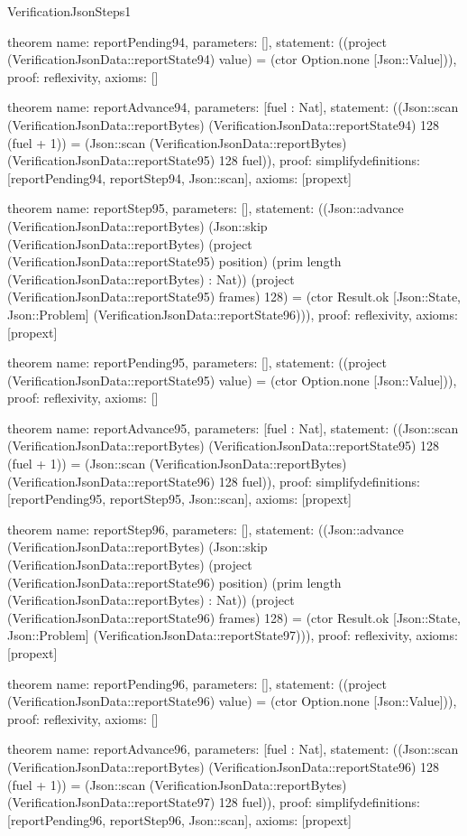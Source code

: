 \begin{lexlean}{VerificationJsonSteps1}
\begin{semanticmodule}
theorem{
  name: reportPending94,
  parameters: [],
  statement: ((project (VerificationJsonData::reportState94) value) = (ctor Option.none [Json::Value])),
  proof: reflexivity{},
  axioms: []
}

theorem{
  name: reportAdvance94,
  parameters: [fuel : Nat],
  statement: ((Json::scan (VerificationJsonData::reportBytes) (VerificationJsonData::reportState94) 128 (fuel + 1)) = (Json::scan (VerificationJsonData::reportBytes) (VerificationJsonData::reportState95) 128 fuel)),
  proof: simplify{definitions: [reportPending94, reportStep94, Json::scan]},
  axioms: [propext]
}

theorem{
  name: reportStep95,
  parameters: [],
  statement: ((Json::advance (VerificationJsonData::reportBytes) (Json::skip (VerificationJsonData::reportBytes) (project (VerificationJsonData::reportState95) position) (prim length (VerificationJsonData::reportBytes) : Nat)) (project (VerificationJsonData::reportState95) frames) 128) = (ctor Result.ok [Json::State, Json::Problem] (VerificationJsonData::reportState96))),
  proof: reflexivity{},
  axioms: [propext]
}

theorem{
  name: reportPending95,
  parameters: [],
  statement: ((project (VerificationJsonData::reportState95) value) = (ctor Option.none [Json::Value])),
  proof: reflexivity{},
  axioms: []
}

theorem{
  name: reportAdvance95,
  parameters: [fuel : Nat],
  statement: ((Json::scan (VerificationJsonData::reportBytes) (VerificationJsonData::reportState95) 128 (fuel + 1)) = (Json::scan (VerificationJsonData::reportBytes) (VerificationJsonData::reportState96) 128 fuel)),
  proof: simplify{definitions: [reportPending95, reportStep95, Json::scan]},
  axioms: [propext]
}

theorem{
  name: reportStep96,
  parameters: [],
  statement: ((Json::advance (VerificationJsonData::reportBytes) (Json::skip (VerificationJsonData::reportBytes) (project (VerificationJsonData::reportState96) position) (prim length (VerificationJsonData::reportBytes) : Nat)) (project (VerificationJsonData::reportState96) frames) 128) = (ctor Result.ok [Json::State, Json::Problem] (VerificationJsonData::reportState97))),
  proof: reflexivity{},
  axioms: [propext]
}

theorem{
  name: reportPending96,
  parameters: [],
  statement: ((project (VerificationJsonData::reportState96) value) = (ctor Option.none [Json::Value])),
  proof: reflexivity{},
  axioms: []
}

theorem{
  name: reportAdvance96,
  parameters: [fuel : Nat],
  statement: ((Json::scan (VerificationJsonData::reportBytes) (VerificationJsonData::reportState96) 128 (fuel + 1)) = (Json::scan (VerificationJsonData::reportBytes) (VerificationJsonData::reportState97) 128 fuel)),
  proof: simplify{definitions: [reportPending96, reportStep96, Json::scan]},
  axioms: [propext]
}


\end{semanticmodule}
\end{lexlean}
